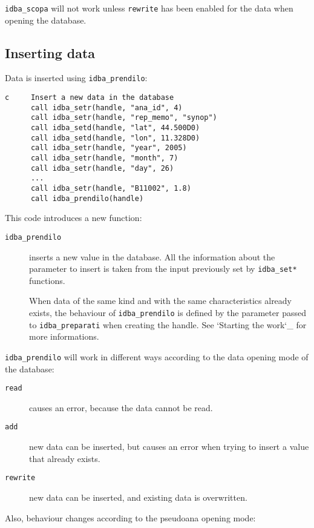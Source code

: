 \documentclass[final,12pt,a4paper,twoside]{book}
\begin{document}
{\tt idba\_scopa} will not work unless {\tt rewrite} has been enabled for the
data when opening the database.


\subsection {Inserting data}

Data is inserted using {\tt idba\_prendilo}:
\label{fun-idba_prendilo}
         
\begin{verbatim}
c     Insert a new data in the database
      call idba_setr(handle, "ana_id", 4)
      call idba_setr(handle, "rep_memo", "synop")
      call idba_setd(handle, "lat", 44.500D0)
      call idba_setd(handle, "lon", 11.328D0)
      call idba_setr(handle, "year", 2005)
      call idba_setr(handle, "month", 7)
      call idba_setr(handle, "day", 26)
      ...
      call idba_setr(handle, "B11002", 1.8)
      call idba_prendilo(handle)
\end{verbatim}

This code introduces a new function:

\begin{description}
\item[{\tt idba\_prendilo}]
  inserts a new value in the database.  All the information about the parameter
  to insert is taken from the input previously set by {\tt idba\_set*} functions.

  When data of the same kind and with the same characteristics already exists,
  the behaviour of {\tt idba\_prendilo} is defined by the parameter passed to
  {\tt idba\_preparati} when creating the handle.  See `Starting the work`\_ for
  more informations.
\end{description}

{\tt idba\_prendilo} will work in different ways according to the data opening
mode of the database:

\begin{description}
\item[{\tt read}]
  causes an error, because the data cannot be read.
\item[{\tt add}]
  new data can be inserted, but causes an error when trying to insert a value
  that already exists.
\item[{\tt rewrite}]
  new data can be inserted, and existing data is overwritten.
\end{description}

Also, behaviour changes according to the pseudoana opening mode:
\end{document}
